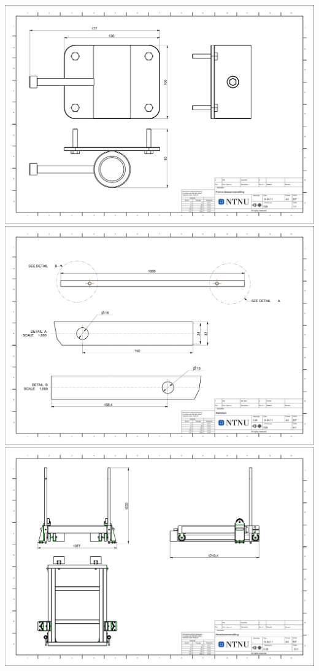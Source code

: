 \includegraphics[angle=90, width=\textwidth]{arbeidstegninger/028}\newpage
\includegraphics[angle=90, width=\textwidth]{arbeidstegninger/029}\newpage
\includegraphics[angle=90, width=\textwidth]{arbeidstegninger/030}\newpage
